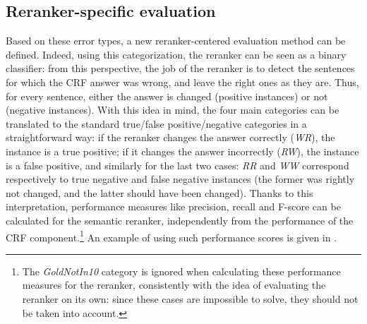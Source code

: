 \documentclass[output=paper,modfonts,nonflat]{langsci/langscibook}
\begin{document}
\subsection{Reranker-specific evaluation}
\label{moreau:sec:rerankerEval}


Based on these error types, a new reranker-centered evaluation method
can be defined. Indeed, using this categorization, the reranker can be
seen as a binary classifier: from this perspective, the job of the
reranker is to detect the sentences for which the CRF answer was
wrong, and leave the right ones as they are. Thus, for every sentence,
either the answer is changed (positive instances) or not (negative
instances). With this idea in mind, the four main categories can be
translated to the standard true/false positive/negative categories in
a straightforward way: if the reranker changes the answer correctly
({\it WR}), the instance is a true positive; if it changes the answer
incorrectly ({\it RW}), the instance is a false positive, and
similarly for the last two cases: {\it RR} and {\it WW} correspond
respectively to true negative and false negative instances (the former
was rightly not changed, and the latter should have been
changed). Thanks to this interpretation, performance measures like
precision, recall and F-score can be calculated for the semantic
reranker, independently from the performance of the CRF
component.\footnote{The {\it GoldNotIn10} category is ignored when
  calculating these performance measures for the reranker,
  consistently with the idea of evaluating the reranker on its own:
  since these cases are impossible to solve, they should not be taken
  into account.} An example of using such performance scores is given
in .
\end{document}
